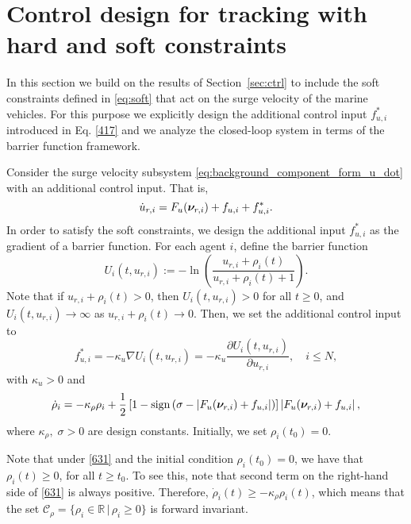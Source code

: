 \section{Control design for tracking with hard and soft constraints}
\label{sec:soft}

In this section we build on the results of Section~\ref{sec:ctrl} to include the soft constraints defined in \eqref{eq:soft} that act on the surge velocity of the marine vehicles.
For this purpose we explicitly design the additional control input $f_{u, i}^*$ introduced in Eq. \eqref{417} and we analyze the closed-loop system in terms of the barrier function framework.


Consider the surge velocity subsystem \eqref{eq:background_component_form_u_dot} with an additional control input. That is,
\begin{equation}\label{622}
	\dot{u}_{r, i} = F_{u}(\bm{\nu}_{r, i}) + f_{u, i} + f_{u, i}^*.
\end{equation}
In order to satisfy the soft constraints, we design the additional input $f_{u, i}^*$ as the gradient of a barrier function.
For each agent $i$, define the barrier function 
\begin{equation}\label{628}
	U_i(t,u_{r, i}):=-\ln\left(\frac{u_{r, i} + \rho_i(t)}{u_{r, i} + \rho_i(t) +1}\right).
\end{equation}
Note that if $u_{r, i} + \rho_i(t)>0$, then $U_i(t,u_{r, i})>0$ for all $t\geq0$, and $U_i(t,u_{r, i})\rightarrow\infty$ as $u_{r, i} + \rho_i(t)\rightarrow0$.
Then, we set the additional control input to
\begin{equation}\label{630}
 f_{u, i}^*= -\kappa_u\nabla U_i(t,u_{r, i}) = -\kappa_u\frac{\partial U_i(t,u_{r, i})}{\partial u_{r, i}}, \quad i\leq N,
\end{equation}
with $\kappa_u>0$ and
\begin{equation}\label{631}
\dot{\rho}_i= -\kappa_\rho \rho_i + \frac{1}{2}\left[1-{\rm sign}\left(\sigma-\left|F_{u}(\bm{\nu}_{r, i})+f_{u, i}\right|\right)\right]\left|F_{u}(\bm{\nu}_{r, i})+f_{u, i}\right|,
\end{equation}
where $\kappa_\rho,\;\sigma>0$ are design constants.
Initially, we set $\rho_i(t_0)=0$.

\begin{rmk}\label{rmk:rho}
	Note that under \eqref{631} and the initial condition $\rho_i(t_0)=0$, we have that $\rho_i(t)\geq 0$, for all $t\geq t_0$. To see this, note that second term on the right-hand side of \eqref{631} is always positive. Therefore, $\dot{\rho}_i(t)\geq -\kappa_\rho \rho_i(t)$, which means that the set $\mathcal{C}_\rho=\{\rho_i\in\mathbb{R}\, | \,\rho_i\geq 0\}$ is forward invariant.
\end{rmk}

